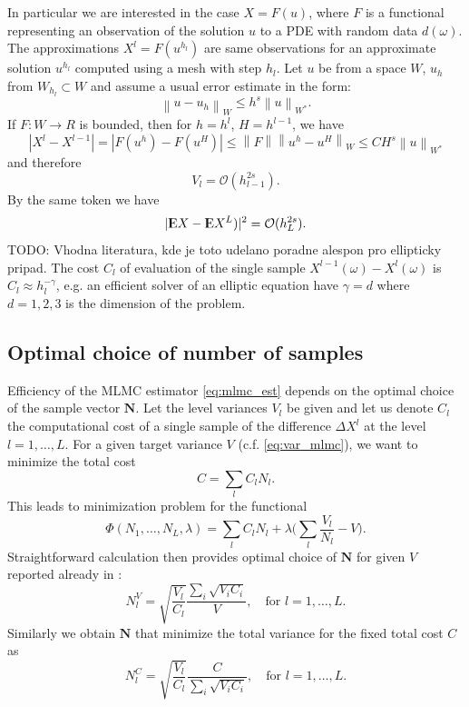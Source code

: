 \documentclass{article}
\def\vc#1{\mathbf{\boldsymbol{#1}}}     %
\def \E{{{\rm I\kern-.3em E}}}
\newcommand{\norm}[1]{\left\lVert#1\right\rVert}
\def\todo#1{{\color{red}TODO: #1}}
\def\abs#1{|#1|}
\begin{document}
In particular we are interested in the case $X=F(u)$, where $F$ is a functional representing an observation of
the solution $u$ to a PDE with random data $d(\omega)$. The approximations $X^l = F(u^{h_l})$ are same observations
for an approximate solution $u^{h_l}$ computed using a mesh with step $h_l$. Let $u$ be from a space $W$, $u_h$ from $W_{h_l} \subset W$ and assume a usual error estimate in the form:
\[
	\norm{u - u_h}_{W} \le h^s \norm{u}_{W^*}.
\] If $F:W \to R$ is bounded, then for $h=h^l$, $H=h^{l-1}$, we have
\[
	\abs{X^l - X^{l-1}} = \abs{F(u^h) - F(u^H)} \le \norm{F}\norm{u^h - u^H}_W \le C H^s\norm{u}_{W^*}
\]
and therefore 
\begin{equation}
    \label{eq:level_var_pde_est}
    V_l =  \mathcal O( h_{l-1}^{2s}).
\end{equation}
By the same token we have 
\begin{equation}
    \label{eq:aprox_pde_est}
    \abs{\E X - \E X^L)}^2 = \mathcal O( h_L^{2s} ).
\end{equation}
\todo{Vhodna literatura, kde je toto udelano poradne alespon pro ellipticky pripad.}
The cost $C_l$ of evaluation of the single sample $X^{l-1}(\omega) - X^l(\omega)$ is $C_l \approx  h_l^{-\gamma}$, e.g. an efficient solver of an elliptic equation have $\gamma=d$  where $d=1,2,3$ is the dimension of the problem. 

\subsection{Optimal choice of number of samples}
Efficiency of the MLMC estimator \eqref{eq:mlmc_est} depends on the optimal choice of the sample vector $\vc N$. Let  the level variances $V_l$ be given and let us denote $C_l$ the computational cost of a single sample of the difference $\Delta X^l$ at the level $l=1,\dots, L$. For a given target variance $V$ (c.f. \eqref{eq:var_mlmc}), we want to minimize the total cost
\begin{equation}
    \label{eq:total_cost}
	C = \sum_l C_l N_l.
\end{equation}
This leads to minimization problem for the functional
\[
	\Phi(N_1, \dots, N_L,\lambda) = \sum_l C_l N_l + \lambda \Big(\sum_l \frac{V_l}{N_l} - V\Big).
\]
Straightforward calculation then provides optimal choice of $\vc N$ for given $V$ reported already in \cite{Giles2015}:
\begin{equation}
	\label{opt_n_for_var}
	N_l^V = \sqrt{\frac{V_l}{C_l}} \frac{\sum_i \sqrt{V_i C_i}}{V}, \quad \text{for }l=1,\dots, L.
\end{equation}
Similarly we obtain $\vc N$ that minimize the total variance for the fixed total cost $C$ as
\begin{equation}
	\label{opt_n_for_cost}
	N_l^C = \sqrt{\frac{V_l}{C_l}} \frac{C}{\sum_i \sqrt{V_i C_i}}
	, \quad \text{for }l=1,\dots, L.
\end{equation}
\end{document}
